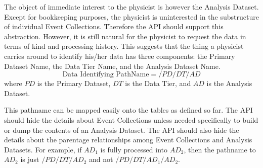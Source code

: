 \documentclass{cmspaper}
\begin{document}
  The object of immediate interest to the physicist is however the Analysis Dataset.
Except for bookkeeping purposes, the physicist is uninterested in the substructure
of individual Event Collections.  Therefore the API should support this abstraction.
However, it is still natural for the physicist to request the data in terms of 
kind and processing history.  This suggests that the thing a physicist carries 
around to identify his/her data has three components: the Primary Dataset Name, the 
Data Tier Name, and the Analysis Dataset Name.  
\begin{equation}
     \mbox{Data Identifying PathName} = /PD/DT/AD
\end{equation}
where $PD$ is the Primary Dataset, $DT$ is the Data Tier, and $AD$ is the Analysis 
Dataset.

  This pathname can be mapped easily onto the tables as defined so far.
The API should hide the details about Event Collections 
unless needed specifically to build or dump the contents of an Analysis Dataset.
The API should also hide the details about the parentage relationships among 
Event Collections and Analysis Datasets.  For example, if $AD_1$ is fully processed 
into $AD_2$, then the pathname to $AD_2$ is just $/PD/DT/AD_2$ and not 
$/PD/DT/AD_1/AD_2$.
\end{document}
